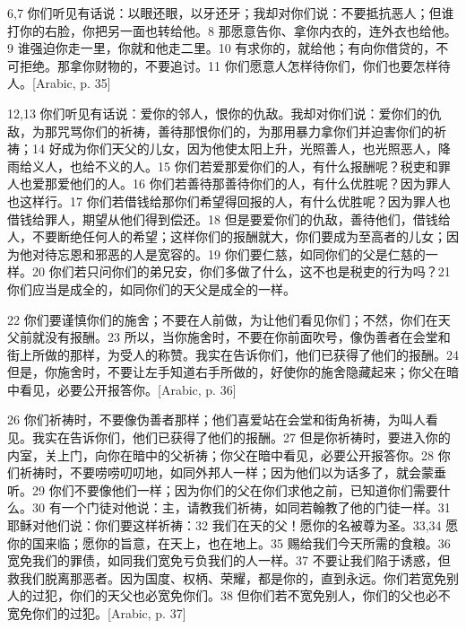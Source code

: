 6,7 你们听见有话说：以眼还眼，以牙还牙；我却对你们说：不要抵抗恶人；但谁打你的右脸，你把另一面也转给他。8 那愿意告你、拿你内衣的，连外衣也给他。9 谁强迫你走一里，你就和他走二里。10 有求你的，就给他；有向你借贷的，不可拒绝。那拿你财物的，不要追讨。11 你们愿意人怎样待你们，你们也要怎样待人。[Arabic, p. 35]\par

12,13 你们听见有话说：爱你的邻人，恨你的仇敌。我却对你们说：爱你们的仇敌，为那咒骂你们的祈祷，善待那恨你们的，为那用暴力拿你们并迫害你们的祈祷；14 好成为你们天父的儿女，因为他使太阳上升，光照善人，也光照恶人，降雨给义人，也给不义的人。15 你们若爱那爱你们的人，有什么报酬呢？税吏和罪人也爱那爱他们的人。16 你们若善待那善待你们的人，有什么优胜呢？因为罪人也这样行。17 你们若借钱给那你们希望得回报的人，有什么优胜呢？因为罪人也借钱给罪人，期望从他们得到偿还。18 但是要爱你们的仇敌，善待他们，借钱给人，不要断绝任何人的希望；这样你们的报酬就大，你们要成为至高者的儿女；因为他对待忘恩和邪恶的人是宽容的。19 你们要仁慈，如同你们的父是仁慈的一样。20 你们若只问你们的弟兄安，你们多做了什么，这不也是税吏的行为吗？21 你们应当是成全的，如同你们的天父是成全的一样。\par

22 你们要谨慎你们的施舍；不要在人前做，为让他们看见你们；不然，你们在天父前就没有报酬。23 所以，当你施舍时，不要在你前面吹号，像伪善者在会堂和街上所做的那样，为受人的称赞。我实在告诉你们，他们已获得了他们的报酬。24 但是，你施舍时，不要让左手知道右手所做的，好使你的施舍隐藏起来；你父在暗中看见，必要公开报答你。[Arabic, p. 36]\par

26 你们祈祷时，不要像伪善者那样；他们喜爱站在会堂和街角祈祷，为叫人看见。我实在告诉你们，他们已获得了他们的报酬。27 但是你祈祷时，要进入你的内室，关上门，向你在暗中的父祈祷；你父在暗中看见，必要公开报答你。28 你们祈祷时，不要唠唠叨叨地，如同外邦人一样；因为他们以为话多了，就会蒙垂听。29 你们不要像他们一样；因为你们的父在你们求他之前，已知道你们需要什么。30 有一个门徒对他说：主，请教我们祈祷，如同若翰教了他的门徒一样。31 耶稣对他们说：你们要这样祈祷：32 我们在天的父！愿你的名被尊为圣。33,34 愿你的国来临；愿你的旨意，在天上，也在地上。35 赐给我们今天所需的食粮。36 宽免我们的罪债，如同我们宽免亏负我们的人一样。37 不要让我们陷于诱惑，但救我们脱离那恶者。因为国度、权柄、荣耀，都是你的，直到永远。你们若宽免别人的过犯，你们的天父也必宽免你们。38 但你们若不宽免别人，你们的父也必不宽免你们的过犯。[Arabic, p. 37]\par

